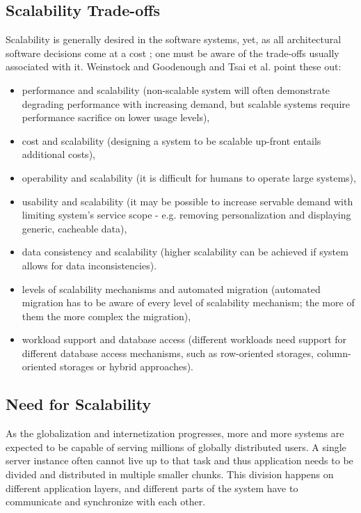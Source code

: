 \documentclass{uvamscse}
\begin{document}
\subsection{Scalability Trade-offs}
Scalability is generally desired in the software systems, yet, as all architectural software decisions come at a cost \cite{GerHeiBench}; one must be aware of the trade-offs usually associated with it. Weinstock and Goodenough \cite{WeinstockOnSystem2006} and Tsai et al. \cite{WeiTek} point these out:
\begin{itemize}
  \item performance and scalability (non-scalable system will often demonstrate degrading performance with increasing demand, but scalable systems require performance sacrifice on lower usage levels),
  \item cost and scalability (designing a system to be scalable up-front entails additional costs),
  \item operability and scalability (it is difficult for humans to operate large systems),
  \item usability and scalability (it may be possible to increase servable demand with limiting system's service scope - e.g. removing personalization and displaying generic, cacheable data),
  \item data consistency and scalability (higher scalability can be achieved if system allows for data inconsistencies).
  \item levels of scalability mechanisms and automated migration (automated migration has to be aware of every level of scalability mechanism; the more of them the more complex the migration),
  \item workload support and database access (different workloads need support for different database access mechanisms, such as row-oriented storages, column-oriented storages or hybrid approaches).
\end{itemize}

\subsection{Need for Scalability}

As the globalization and internetization progresses, more and more systems are expected to be capable of serving millions of globally distributed users. A single server instance often cannot live up to that task and thus application needs to be divided and distributed in multiple smaller chunks. This division happens on different application layers, and different parts of the system have to communicate and synchronize with each other.
\end{document}
